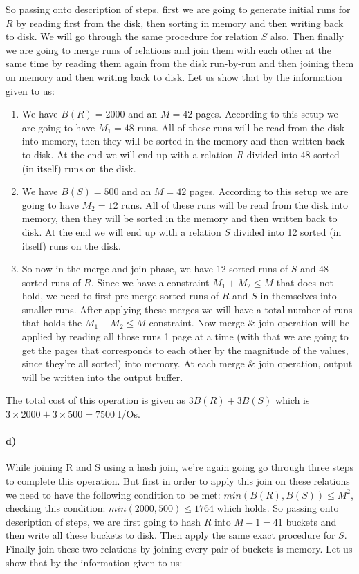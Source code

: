 \documentclass[a4paper,12pt]{article}
\begin{document}
So passing onto description of steps, first we are going to generate initial runs for $R$ by reading first from the disk, then sorting in memory and then writing back to disk. We will go through the same procedure for relation $S$ also. Then finally we are going to merge runs of relations and join them with each other at the same time by reading them again from the disk run-by-run and then joining them on memory and then writing back to disk. Let us show that by the information given to us:

\begin{enumerate}
    \item We have $B(R)=2000$ and an $M=42$ pages. According to this setup we are going to have $M_1=48$ runs. All of these runs will be read from the disk into memory, then they will be sorted in the memory and then written back to disk. At the end we will end up with a relation $R$ divided into 48 sorted (in itself) runs on the disk.
    \item We have $B(S)=500$ and an $M=42$ pages. According to this setup we are going to have $M_2=12$ runs. All of these runs will be read from the disk into memory, then they will be sorted in the memory and then written back to disk. At the end we will end up with a relation $S$ divided into 12 sorted (in itself) runs on the disk.
    \item So now in the merge and join phase, we have 12 sorted runs of $S$ and 48 sorted runs of $R$. Since we have a constraint $M_1+M_2 \leq M$ that does not hold, we need to first pre-merge sorted runs of $R$ and $S$ in themselves into smaller runs. After applying these merges we will have a total number of runs that holds the $M_1+M_2 \leq M$ constraint. Now merge \& join operation will be applied by reading all those runs 1 page at a time (with that we are going to get the pages that corresponds to each other by the magnitude of the values, since they're all sorted) into memory. At each merge \& join operation, output will be written into the output buffer.
\end{enumerate}

The total cost of this operation is given as $3B(R) + 3B(S)$ which is $3\times 2000 + 3\times 500 = 7500$ I/Os.

\paragraph{d)} While joining R and S using a hash join, we're again going go through three steps to complete this operation. But first in order to apply this join on these relations we need to have the following condition to be met: $min(B(R), B(S)) \leq M^2$, checking this condition: $min(2000, 500) \leq 1764$ which holds. So passing onto description of steps, we are first going to hash $R$ into $M-1=41$ buckets and then write all these buckets to disk. Then apply the same exact procedure for $S$. Finally join these two relations by joining every pair of buckets is memory. Let us show that by the information given to us:
\end{document}
